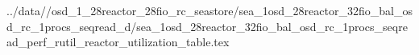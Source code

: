 ../data//osd_1_28reactor_28fio_rc_seastore/sea_1osd_28reactor_32fio_bal_osd_rc_1procs_seqread_d/sea_1osd_28reactor_32fio_bal_osd_rc_1procs_seqread_perf_rutil_reactor_utilization_table.tex